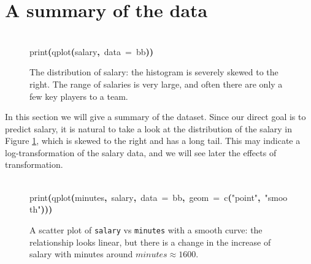 \documentclass[english]{article}
\newenvironment{dummy}{\par}{\par}
\newcommand{\hlfunctioncall}[1]{\textcolor[rgb]{1,0,0}{#1}}%
\newcommand{\hlstring}[1]{\textcolor[rgb]{0.6,0.6,1}{#1}}%
\newcommand{\hlkeyword}[1]{\textcolor[rgb]{0,0,0}{\textbf{#1}}}%
\newcommand{\hlargument}[1]{\textcolor[rgb]{0.694117647058824,0.247058823529412,0.0196078431372549}{#1}}%
\newcommand{\hlsymbol}[1]{\textcolor[rgb]{0,0,0}{#1}}%
\newcommand{\hlprompt}[1]{\textcolor[rgb]{0,0,0}{#1}}%
\newcommand{\hlstd}[1]{\textcolor[rgb]{0,0,0}{#1}}%
\begin{document}
\section{A summary of the data\label{sec:summary}}

%
\begin{figure}
\begin{dummy}
\hspace*{\fill}\\
\hlstd{}\ttfamily\noindent
\hlprompt{\usebox{\hlnormalsizeboxgreaterthan}{\ }}\hlfunctioncall{print}\hlkeyword{(}\hlfunctioncall{qplot}\hlkeyword{(}\hlsymbol{salary}\hlkeyword{,}{\ }\hlargument{data}{\ }\hlargument{=}{\ }\hlsymbol{bb}\hlkeyword{)}\hlkeyword{)}\mbox{}
\normalfont
\hspace*{\fill}\\
\hlstd{}
\begin{center}


\endpgfgraphicnamed
\end{center}
\end{dummy}
\caption{The distribution of salary: the histogram is severely skewed to the
right. The range of salaries is very large, and often there are only
a few key players to a team.\label{fig:hist-salary}}

\end{figure}


In this section we will give a summary of the dataset. Since our direct
goal is to predict salary, it is natural to take a look at the distribution
of the salary in Figure \ref{fig:hist-salary}, which is skewed to
the right and has a long tail. This may indicate a log-transformation
of the salary data, and we will see later the effects of transformation.

%
\begin{figure}
\begin{dummy}
\hspace*{\fill}\\
\hlstd{}\ttfamily\noindent
\hlprompt{\usebox{\hlnormalsizeboxgreaterthan}{\ }}\hlfunctioncall{print}\hlkeyword{(}\hlfunctioncall{qplot}\hlkeyword{(}\hlsymbol{minutes}\hlkeyword{,}{\ }\hlsymbol{salary}\hlkeyword{,}{\ }\hlargument{data}{\ }\hlargument{=}{\ }\hlsymbol{bb}\hlkeyword{,}{\ }\hlargument{geom}{\ }\hlargument{=}{\ }\hlfunctioncall{c}\hlkeyword{(}\hlstring{"point"}\hlkeyword{,}{\ }\hlstring{"smooth"}\hlkeyword{)}\hlkeyword{)}\hlkeyword{)}\mbox{}
\normalfont
\hspace*{\fill}\\
\hlstd{}
\begin{center}


\endpgfgraphicnamed
\end{center}
\end{dummy}
\caption{A scatter plot of \texttt{salary} vs \texttt{minutes} with a smooth
curve: the relationship looks linear, but there is a change in the
increase of salary with minutes around $minutes\approx1600$.\label{fig:salary-minutes}}

\end{figure}
\end{document}
